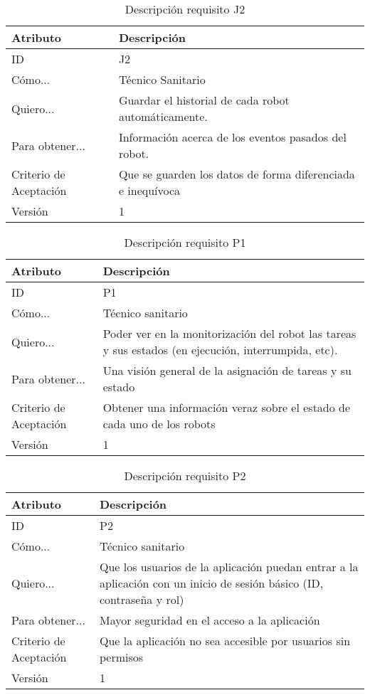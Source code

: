 
\begin{table}[H]
    \label{tab:reqJ1}
 	\caption{Descripción requisito J2}
	\centering
	
	\begin{tabular}{C{3cm}|C{12cm}}
 		\toprule
 		\textbf{Atributo} & \textbf{Descripción} \\
 		\midrule
 	    ID & J2 \\
 	    Cómo... & Técnico Sanitario \\
 	    Quiero... & Guardar el historial de cada robot automáticamente. \\
 	    Para obtener... & Información acerca de los eventos pasados del robot.  \\
 	    Criterio de Aceptación & Que se guarden los datos de forma diferenciada e inequívoca  \\
 	    Versión & 1 \\
 		\bottomrule
 		\end{tabular}
\end{table}
\begin{table}[H]
    \label{tab:reqF2}
 	\caption{Descripción requisito P1}
	\centering

	\begin{tabular}{C{3cm}|C{12cm}}
 		\toprule
 		\textbf{Atributo} & \textbf{Descripción} \\
 		\midrule
 	    ID & P1 \\
 	    Cómo... & Técnico sanitario \\
 	    Quiero... & Poder ver en la monitorización del robot las tareas y sus estados (en ejecución, interrumpida, etc). \\
 	    Para obtener... & Una visión general de la asignación de tareas y su estado  \\
 	    Criterio de Aceptación & Obtener una información veraz sobre el estado de cada uno de los robots \\
 	    Versión & 1 \\
 		\bottomrule
 		\end{tabular}
\end{table}

\begin{table}[H]
    \label{tab:reqF2}
 	\caption{Descripción requisito P2}
	\centering

	\begin{tabular}{C{3cm}|C{12cm}}
 		\toprule
 		\textbf{Atributo} & \textbf{Descripción} \\
 		\midrule
 	    ID & P2 \\
 	    Cómo... & Técnico sanitario \\
 	    Quiero... & Que los usuarios de la aplicación puedan entrar a la aplicación con un inicio de sesión básico (ID, contraseña y rol) \\
 	    Para obtener... & Mayor seguridad en el acceso a la aplicación  \\
 	    Criterio de Aceptación & Que la aplicación no sea accesible por usuarios sin permisos \\
 	    Versión & 1 \\
 		\bottomrule
 		\end{tabular}
\end{table}

